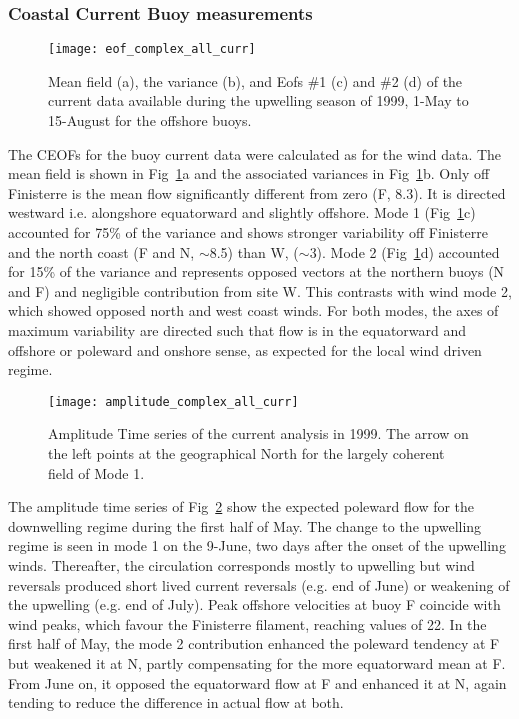 \subsubsection{Coastal Current Buoy measurements}
\begin{figure}
\texttt{[image: eof\_complex\_all\_curr]}
\caption{Mean field (a), the variance (b), and Eofs \#1 (c) and
\#2 (d) of the current data available during the upwelling season
of 1999, 1-May to 15-August for the offshore
buoys.}\label{fig:windsmeanvarbuoyscurr}
\end{figure}

The CEOFs for the buoy current data were calculated as for the
wind data. The mean field is shown in
{Fig~\ref{fig:windsmeanvarbuoyscurr}}a and the associated
variances in Fig~\ref{fig:windsmeanvarbuoyscurr}b. Only off
Finisterre is the mean flow significantly different from zero (F,
8.3\velc ). It is directed westward i.e. alongshore equatorward
and slightly offshore. Mode 1
(Fig~\ref{fig:windsmeanvarbuoyscurr}c) accounted for 75\% of the
variance and shows stronger variability off Finisterre and the
north coast (F and N, $\sim$8.5\velc ) than W, ($\sim$3\velc ).
Mode 2 (Fig~\ref{fig:windsmeanvarbuoyscurr}d) accounted for 15\%
of the variance and represents opposed vectors at the northern
buoys (N and F) and negligible contribution from site W. This
contrasts with wind mode 2, which showed opposed north and west
coast winds. For both modes, the axes of maximum variability are
directed such that flow is in the equatorward and offshore or
poleward and onshore sense, as expected for the local wind driven
regime.
\begin{figure}[t]
\texttt{[image: amplitude\_complex\_all\_curr]}
\caption{Amplitude Time series of the current analysis in 1999.
The arrow on the left points at the geographical North for the
largely coherent field of Mode 1.}\label{fig:windsampbuoyscurr}
\end{figure}
The amplitude time series of {Fig~\ref{fig:windsampbuoyscurr}}
show the expected poleward flow for the downwelling regime during
the first half of May. The change to the upwelling regime is seen
in mode 1 on the 9-June, two days after the onset of the upwelling
winds. Thereafter, the circulation corresponds mostly to upwelling
but wind reversals produced short lived current reversals (e.g.
end of June) or weakening of the upwelling (e.g. end of July).
Peak offshore velocities at buoy F coincide with wind peaks, which
favour the Finisterre filament, reaching values of 22\velc . In
the first half of May, the mode 2 contribution enhanced the
poleward tendency at F but weakened it at N, partly compensating
for the more equatorward mean at F. From June on, it opposed the
equatorward flow at F and enhanced it at N, again tending to
reduce the difference in actual flow at both.

